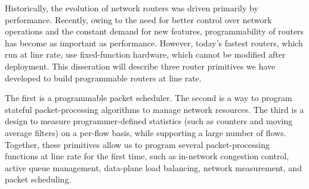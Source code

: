 % 
% 
%

Historically, the evolution of network routers was driven primarily by
performance. Recently, owing to the need for better control over network
operations and the constant demand for new features, programmability of routers
has become as important as performance.  However, today's fastest routers,
which run at line rate, use fixed-function hardware, which cannot be modified
after deployment. This disseration will describe three router primitives we
have developed to build programmable routers at line rate.

The first is a programmable packet scheduler. The second is a way to program
stateful packet-processing algorithms to manage network resources. The third is
a design to measure programmer-defined statistics (such as counters and moving
average filters) on a per-flow basis, while supporting a large number of flows.
Together, these primitives allow us to program several packet-processing
functions at line rate for the first time, such as in-network congestion
control, active queue management, data-plane load balancing, network
measurement, and packet scheduling.

